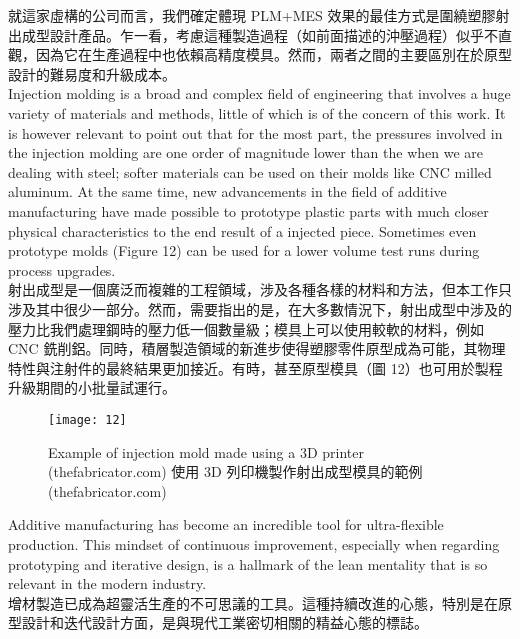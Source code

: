 \fontsize{14pt}{5pt}\sectionef
 {就這家虛構的公司而言，我們確定體現 PLM+MES 效果的最佳方式是圍繞塑膠射出成型設計產品。乍一看，考慮這種製造過程（如前面描述的沖壓過程）似乎不直觀，因為它在生產過程中也依賴高精度模具。然而，兩者之間的主要區別在於原型設計的難易度和升級成本。}\\[15pt]

\fontsize{14pt}{2.5pt}\sectionef 
{Injection molding is a broad and complex field of engineering that involves a huge variety of materials and methods, little of which is of the concern of this work. It is however relevant to point out that for the most part, the pressures involved in the injection molding are one order of magnitude lower than the when we are dealing with steel; softer materials can be used on their molds like CNC milled aluminum. At the same time, new advancements in the field of additive manufacturing have made possible to prototype plastic parts with much closer physical characteristics to the end result of a injected piece. Sometimes even prototype molds (Figure 12) can be used for a lower volume test runs during process upgrades.}\\[10pt]

\fontsize{14pt}{5pt}\sectionef
 {射出成型是一個廣泛而複雜的工程領域，涉及各種各樣的材料和方法，但本工作只涉及其中很少一部分。然而，需要指出的是，在大多數情況下，射出成型中涉及的壓力比我們處理鋼時的壓力低一個數量級；模具上可以使用較軟的材料，例如 CNC 銑削鋁。同時，積層製造領域的新進步使得塑膠零件原型成為可能，其物理特性與注射件的最終結果更加接近。有時，甚至原型模具（圖 12）也可用於製程升級期間的小批量試運行。}\\[15pt]

\begin{figure}[hbt!]
\begin{center}
\texttt{[image: 12]}
\caption{\Large Example of injection mold made using a 3D printer (thefabricator.com) 使用 3D 列印機製作射出成型模具的範例 (thefabricator.com)}\label{fig.12}
\end{center}
\end{figure}
\newpage

\fontsize{14pt}{2.5pt}\sectionef 
{Additive manufacturing has become an incredible tool for ultra-flexible production. This mindset of continuous improvement, especially when regarding prototyping and iterative design, is a hallmark of the lean mentality that is so relevant in the modern industry.}\\[10pt]

\fontsize{14pt}{5pt}\sectionef
 {增材製造已成為超靈活生產的不可思議的工具。這種持續改進的心態，特別是在原型設計和迭代設計方面，是與現代工業密切相關的精益心態的標誌。
}\\[15pt]

